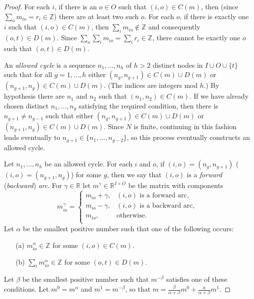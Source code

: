 \documentclass[12pt, A4paper]{article}
\theoremstyle{definition}
\renewcommand{\Re}{\mathbb{R}}
\newcommand{\In}{\mathbb{Z}}
\begin{document}
\begin{appendix}
\begin{proof} %
  For each $i$, if there is an $o \in O$ such that $(i,o) \in C(m)$, then (since $\sum_o m_{io} = r_i \in \In$) there are at least two such $o$.  For each $o$, if there is exactly one $i$ such that $(i,o) \in C(m)$, then $\sum_i m_{io} \notin \In$ and consequently $(o,t) \in D(m)$.  Since $\sum_o \sum_i m_{io} = \sum_i r_i \in \In$, there cannot be exactly one $o$ such that $(o,t) \in D(m)$.  
  
  An \emph{allowed cycle} is a sequence $n_1, \ldots, n_h$ of $h > 2$ distinct nodes in $I \cup O \cup \{t\}$ such that for all $g = 1, \ldots, h$ either $(n_g,n_{g+1}) \in C(m) \cup D(m)$ or $(n_{g+1},n_g) \in C(m) \cup D(m)$. (The indices are integers mod $h$.)  By hypothesis there are $n_1$ and $n_2$ such that $(n_1,n_2) \in C(m)$.  If we have already chosen distinct $n_1, \ldots, n_g$ satisfying the required condition, then there is $n_{g+1} \ne n_{g-1}$ such that either $(n_g,n_{g+1}) \in C(m) \cup D(m)$ or $(n_{g+1},n_g) \in C(m) \cup D(m)$.  Since $N$ is finite, continuing in this fashion leads eventually to $n_{g+1} \in \{n_1,\ldots,n_{g-2}\}$, so this process eventually constructs an allowed cycle.

  Let $n_1, \ldots, n_h$ be an allowed cycle. For each $i$ and $o$, if $(i,o) = (n_g,n_{g+1})$ ($(i,o) = (n_{g+1},n_g)$) for some $g$, then we say that $(i,o)$ is a  \emph{forward} (\emph{backward}) \emph{arc}.  For $\gamma \in \Re$ let $m^\gamma \in \Re^{I \times O}$ be the matrix with components
  $$m_{io}^\gamma = \begin{cases}
  m_{io} + \gamma, & \text{$(i,o)$ is a forward arc}, \\
  m_{io} - \gamma, & \text{$(i,o)$ is a backward arc}, \\
  m_{io}, & \text{otherwise}. \\
  \end{cases}$$
  Let $\alpha$ be the smallest positive number such that one of the following occurs:
  \begin{enumerate}
    \item[(a)] $m^\alpha_{io} \in \In$ for some $(i,o) \in C(m)$.
    \item[(b)] $\sum_i  m^\alpha_{io} \in \In$ for some $(o,t) \in D(m)$.  
  \end{enumerate}
  Let $\beta$ be the smallest positive number such that $m^{-\beta}$ satisfies one of these conditions.   Let $m^0 = m^\alpha$ and $m^1 = m^{-\beta}$, so that  $m = \tfrac{\beta}{\alpha + \beta}m^0 + \tfrac{\alpha}{\alpha + \beta}m^1$.  
  

\end{proof}
\end{appendix}
\end{document}
